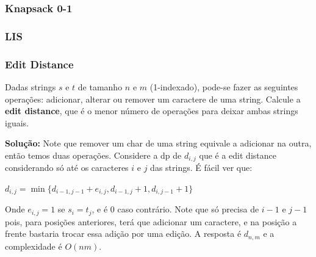 \subsubsection{Knapsack 0-1}


\subsubsection{LIS}


\subsubsection{Edit Distance}

 Dadas strings $s$ e $t$ de tamanho $n$ e $m$ (1-indexado), pode-se fazer as seguintes operações: adicionar, alterar ou remover um caractere de uma string. Calcule a \textbf{edit distance}, que é o menor número de operações para deixar ambas strings iguais.

\textbf{Solução:} Note que remover um char de uma string equivale a adicionar na outra, então temos duas operações. Considere a dp de $d_{i, j}$ que é a edit distance considerando só até os caracteres $i$ e $j$ das strings. É fácil ver que:

$d_{i,j} = \min\{d_{i-1,j-1} + e_{i,j}, d_{i-1,j}+1, d_{i,j-1}+1\}$

Onde $e_{i,j} = 1$ se $s_i = t_j$, e é $0$ caso contrário. Note que só precisa de $i-1$ e $j-1$ pois, para posições anteriores, terá que adicionar um caractere, e na posição a frente bastaria trocar essa adição por uma edição. A resposta é $d_{n,m}$ e a complexidade é $O(nm)$.


